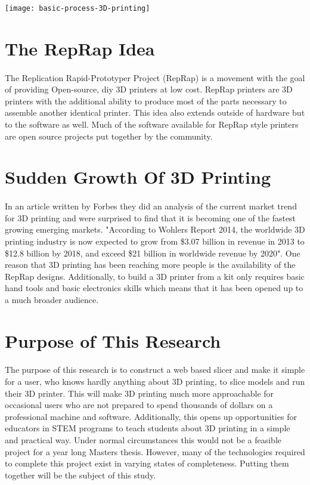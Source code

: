 \texttt{[image: basic-process-3D-printing]}

\section{The RepRap Idea}
\paragraph{}
The Replication Rapid-Prototyper Project (RepRap) is a movement with the goal of providing Open-source, diy 3D printers at low cost.
RepRap printers are 3D printers with the additional ability to produce most of the parts necessary to assemble another identical printer.
This idea also extends outside of hardware but to the software as well.
Much of the software available for RepRap style printers are open source projects put together by the community.

\section{Sudden Growth Of 3D Printing}
\paragraph{}
In an article written by Forbes they did an analysis of the current market trend for 3D printing and were surprised to find that it is becoming one of the fastest growing emerging markets.
"According to Wohlers Report 2014, the worldwide 3D printing industry is now expected to grow from \$3.07 billion in revenue in 2013 to \$12.8 billion by 2018, and exceed \$21 billion in worldwide revenue by 2020". \citet{forbes3D}
One reason that 3D printing has been reaching more people is the availability of the RepRap designs.
Additionally, to build a 3D printer from a kit only requires basic hand tools and basic electronics skills which means that it has been opened up to a much broader audience.

\section{Purpose of This Research}
\paragraph{}
The purpose of this research is to construct a web based slicer and make it simple for a user, who knows hardly anything about 3D printing, to slice models and run their 3D printer.
This will make 3D printing much more approachable for occasional users who are not prepared to spend thousands of dollars on a professional machine and software.
Additionally, this opens up opportunities for educators in STEM programs to teach students about 3D printing in a simple and practical way.
Under normal circumstances this would not be a feasible project for a year long Masters thesis.
However, many of the technologies required to complete this project exist in varying states of completeness.
Putting them together will be the subject of this study.


